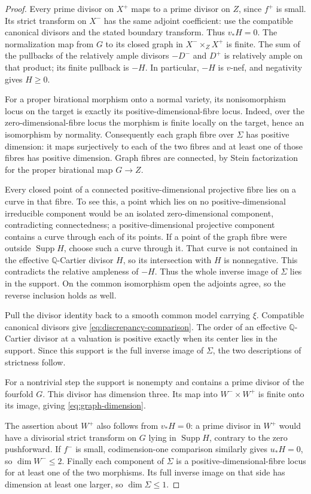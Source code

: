 \begin{proof}
Every prime divisor on $X^+$ maps to a prime divisor on $Z$, since $f^+$ is small. Its strict transform on $X^-$ has the same adjoint coefficient: use the compatible canonical divisors and the stated boundary transform. Thus $v_*H=0$. The normalization map from $G$ to its closed graph in $X^-\times_Z X^+$ is finite. The sum of the pullbacks of the relatively ample divisors $-D^-$ and $D^+$ is relatively ample on that product; its finite pullback is $-H$. In particular, $-H$ is $v$-nef, and negativity gives $H\geq0$.

For a proper birational morphism onto a normal variety, its nonisomorphism locus on the target is exactly its positive-dimensional-fibre locus. Indeed, over the zero-dimensional-fibre locus the morphism is finite locally on the target, hence an isomorphism by normality. Consequently each graph fibre over $\Sigma$ has positive dimension: it maps surjectively to each of the two fibres and at least one of those fibres has positive dimension. Graph fibres are connected, by Stein factorization for the proper birational map $G\to Z$.

Every closed point of a connected positive-dimensional projective fibre lies on a curve in that fibre. To see this, a point which lies on no positive-dimensional irreducible component would be an isolated zero-dimensional component, contradicting connectedness; a positive-dimensional projective component contains a curve through each of its points. If a point of the graph fibre were outside $\operatorname{Supp}H$, choose such a curve through it. That curve is not contained in the effective $\mathbb Q$-Cartier divisor $H$, so its intersection with $H$ is nonnegative. This contradicts the relative ampleness of $-H$. Thus the whole inverse image of $\Sigma$ lies in the support. On the common isomorphism open the adjoints agree, so the reverse inclusion holds as well.

Pull the divisor identity back to a smooth common model carrying $\xi$. Compatible canonical divisors give \eqref{eq:discrepancy-comparison}. The order of an effective $\mathbb Q$-Cartier divisor at a valuation is positive exactly when its center lies in the support. Since this support is the full inverse image of $\Sigma$, the two descriptions of strictness follow.

For a nontrivial step the support is nonempty and contains a prime divisor of the fourfold $G$. This divisor has dimension three. Its map into $W^-\times W^+$ is finite onto its image, giving \eqref{eq:graph-dimension}.

The assertion about $W^+$ also follows from $v_*H=0$: a prime divisor in $W^+$ would have a divisorial strict transform on $G$ lying in $\operatorname{Supp}H$, contrary to the zero pushforward. If $f^-$ is small, codimension-one comparison similarly gives $u_*H=0$, so $\dim W^-\leq2$. Finally each component of $\Sigma$ is a positive-dimensional-fibre locus for at least one of the two morphisms. Its full inverse image on that side has dimension at least one larger, so $\dim\Sigma\leq1$.
\end{proof}

